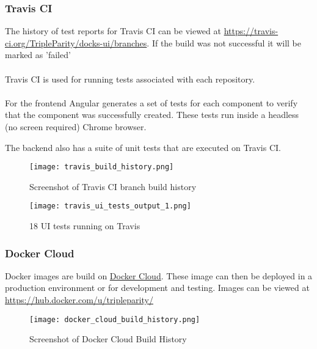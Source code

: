 \documentclass[]{article}
\begin{document}
\subsubsection{Travis CI}
The history of test reports for Travis CI can be viewed at \url{https://travis-ci.org/TripleParity/docks-ui/branches}.
If the build was not successful it will be marked as 'failed' \\
\\
Travis CI is used for running tests associated with each repository. \\
\\
For the frontend Angular generates a set of tests for each component to verify
that the component was successfully created. These tests run inside a
headless (no screen required) Chrome browser.

The backend also has a suite of unit tests that are executed on Travis CI.

\begin{figure}[H]
	\centering
	\texttt{[image: travis\_build\_history.png]}
	\caption{Screenshot of Travis CI branch build history}
\end{figure}

\begin{figure}[H]
	\centering
	\texttt{[image: travis\_ui\_tests\_output\_1.png]}
	\caption{18 UI tests running on Travis}
\end{figure}

\subsubsection{Docker Cloud}
Docker images are build on \href{https://cloud.docker.com/}{Docker Cloud}.
These image can then be deployed in a production environment or for development and testing.
Images can be viewed at \url{https://hub.docker.com/u/tripleparity/}

\begin{figure}[H]
	\centering
	\texttt{[image: docker\_cloud\_build\_history.png]}
	\caption{Screenshot of Docker Cloud Build History}
\end{figure}
\end{document}
